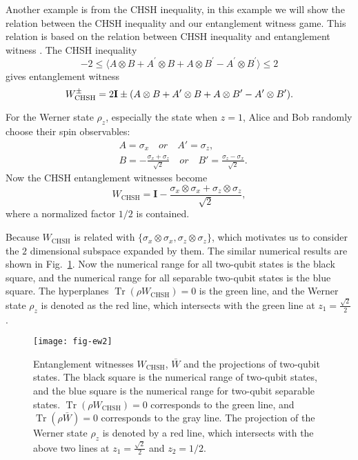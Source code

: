 \documentclass[twocolumn,pra,showpacs,superscriptaddress]{revtex4-1}
\DeclareMathOperator{\Tr}{Tr}
\begin{document}
Another example is from the CHSH inequality\cite{cla}, in this example
we will show the relation between the CHSH inequality and our entanglement
witness game. This relation is based on the relation between CHSH inequality and
entanglement witness \cite{hyl}. The CHSH inequality
\begin{equation}
  \label{eq:2}
 -2\leq\langle A\otimes B + A^{\prime} \otimes
  B + A\otimes B^{\prime} - A^{\prime} \otimes B^{\prime}\rangle\le 2
\end{equation}
gives entanglement witness
\begin{equation}
  \label{eq:3}
  W^{\pm}_{\text{CHSH}} = 2\textbf{I} \pm\-  (A\otimes B + A^{\prime} \otimes
  B + A\otimes B^{\prime} - A^{\prime} \otimes B^{\prime}).
\end{equation}

For the Werner state $\rho_{z}$, especially the state when $z=1$,
Alice and Bob randomly choose their spin observables:
\begin{equation}
\begin{split}
  & A=\sigma_x \quad or \quad A'=\sigma_z, \\
  & B =-\frac{\sigma_x+\sigma_z}{\sqrt{2}}\quad or \quad
  B'=\frac{\sigma_z-\sigma_x}{\sqrt{2}}.
\end{split}\label{eq:9}
\end{equation}
Now the CHSH entanglement witnesses become
\begin{equation}
  \label{eq:4}
  W_{\text{CHSH}} = \textbf{I} - \frac{\sigma_{x} \otimes \sigma_{x} +
    \sigma_{z} \otimes \sigma_{z} }{\sqrt{2}},
\end{equation}
where a normalized factor $1/2$ is contained.

Because $W_{\text{CHSH}}$ is related with
$\{\sigma_{x}\otimes\sigma_{x}, \sigma_{z}\otimes\sigma_{z}\}$, which
motivates us to consider the $2$ dimensional subspace expanded by
them. The similar numerical results are shown in Fig.~\ref{fig3}.
Now the numerical range for all two-qubit states is the black square,
and the numerical range for all separable two-qubit states is the blue
square. The hyperplanes $\Tr(\rho W_{\text{CHSH}})=0$ is the green
line, and the Werner state $\rho_{z}$ is denoted as the red line,
which intersects with the green line at $z_{1}=\frac{\sqrt{2}}{2}$.

\begin{figure}[htbp]
  \centering
  \texttt{[image: fig-ew2]}
  \caption{Entanglement witnesses $W_{\text{CHSH}}$, $\bar{W}$ and the
    projections of two-qubit states. The black square is the numerical
    range of two-qubit states, and the blue square is the numerical
    range for two-qubit separable states.
    $\Tr(\rho W_{\text{CHSH}})=0$ corresponds to the green line, and
    $\Tr(\rho \bar{W})=0$ corresponds to the gray line. The projection
    of the Werner state $\rho_{z}$ is denoted by a red line, which
    intersects with the above two lines at $z_{1}=\frac{\sqrt{2}}{2}$
    and $z_{2}=1/2$. }
  \label{fig3}
\end{figure}
\end{document}

